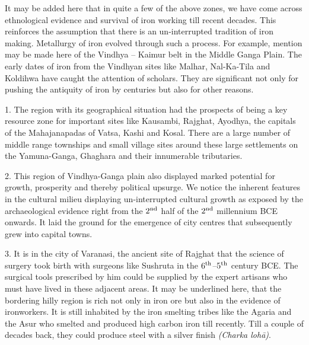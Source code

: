 It may be added here that in quite a few of the above zones, we have come across ethnological evidence and survival of iron working till recent decades. This reinforces the assumption that there is an un-interrupted tradition of iron making. Metallurgy of iron evolved through such a process. For example, mention may be made here of the Vindhya – Kaimur belt in the Middle Ganga Plain. The early dates of iron from the Vindhyan sites like Malhar, Nal-Ka-Tila and Koldihwa have caught the attention of scholars. They are significant not only for pushing the antiquity of iron by centuries but also for other reasons.

1. The region with its geographical situation had the prospects of being a key resource zone for important sites like Kausambi, Rajghat, Ayodhya, the capitals of the Mahajanapadas of Vatsa, Kashi and Kosal. There are a large number of middle range townships and small village sites around these large settlements on the Yamuna-Ganga, Ghaghara and their innumerable tributaries.

2. This region of Vindhya-Ganga plain also displayed marked potential for growth, prosperity and thereby political upsurge. We notice the inherent features in the cultural milieu displaying un-interrupted cultural growth as exposed by the archaeological evidence right from the $2^{\rm nd}$ half of the $2^{\rm nd}$ millennium BCE onwards. It laid the ground for the emergence of city centres that subsequently grew into capital towns.

3. It is in the city of Varanasi, the ancient site of Rajghat that the science of surgery took birth with surgeons like Sushruta in the $6^{\rm th}$–$5^{\rm th}$ century BCE. The surgical tools prescribed by him could be supplied by the expert artisans who must have lived in these adjacent areas. It may be underlined here, that the bordering hilly region is rich not only in iron ore but also in the evidence of ironworkers. It is still inhabited by the iron smelting tribes like the Agaria and the Asur who smelted and produced high carbon iron till recently. Till a couple of decades back, they could produce steel with a silver finish \textit{(Charka lohā)}.

